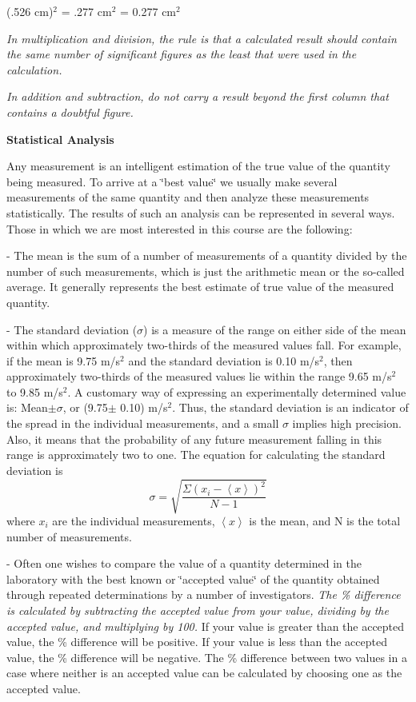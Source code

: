{\centering (.526 cm)\( ^{2} \) = .277
cm\( ^{2} \) = 0.277 cm\( ^{2} \)\par}

\textit{In multiplication and division, the rule is that a calculated
result should contain the same number of significant figures as the
least that were used in the calculation.}

\textit{In addition and subtraction, do not carry a result beyond
the first column that contains a doubtful figure.}

\textbf{Statistical Analysis} 

Any measurement is an intelligent estimation of the true value of
the quantity being measured. To arrive at a \char`\"{}best value\char`\"{}
we usually make several measurements of the same quantity and then
analyze these measurements statistically. The results of such an analysis
can be represented in several ways. Those in which we are most interested
in this course are the following:

 - The mean is the sum of a number of measurements
of a quantity divided by the number of such measurements, which is
just the arithmetic mean or the so-called average. It generally represents the best estimate of true value of the measured quantity.

 - The standard deviation (\( \sigma  \))
is a measure of the range on either side of the mean within which
approximately two-thirds of the measured values fall. For example,
if the mean is 9.75 m/s\( ^{2} \) and the standard deviation is 0.10
m/s\( ^{2} \), then approximately two-thirds of the measured values
lie within the range 9.65 m/s\( ^{2} \) to 9.85 m/s\( ^{2} \). A
customary way of expressing an experimentally determined value is:
Mean\( \pm  \)\( \sigma  \), or (9.75\( \pm  \) 0.10) m/s\( ^{2} \).
Thus, the standard deviation is an indicator of the spread in the
individual measurements, and a small \( \sigma  \) implies high precision.
Also, it means that the probability of any future measurement falling
in this range is approximately two to one. The equation for calculating
the standard deviation is\[
\sigma =\sqrt{\frac{\Sigma \left( x_{i}-\left\langle x\right\rangle \right) ^{2}}{N-1}}\]
 where \( x_{i} \) are the individual measurements, \( \left\langle x\right\rangle  \)
is the mean, and N is the total number of measurements.

 - Often one wishes to compare the value of
a quantity determined in the laboratory with the best known or \char`\"{}accepted
value\char`\"{} of the quantity obtained through repeated determinations
by a number of investigators. \textit{The \% difference is calculated
by subtracting the accepted value from your value, dividing by the
accepted value, and multiplying by 100.} If your value is greater
than the accepted value, the \% difference will be positive. If your
value is less than the accepted value, the \% difference will be negative.
The \% difference between two values in a case where neither is an
accepted value can be calculated by choosing one as the accepted value.
